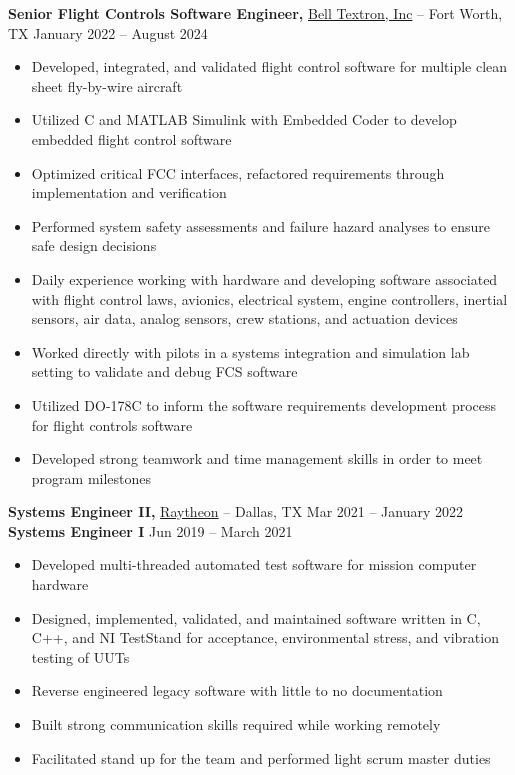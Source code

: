 \documentclass[11pt]{article}       %
\begin{document}
\textbf{Senior Flight Controls Software Engineer,} \href{https://www.bellflight.com/}{Bell Textron, Inc} -- Fort Worth, TX \hfill January 2022 -- August 2024 \\
\vspace{-9pt}
\begin{itemize}
  \item Developed, integrated, and validated flight control software for multiple clean sheet fly-by-wire aircraft
  \item Utilized C and MATLAB Simulink with Embedded Coder to develop embedded flight control software
  \item Optimized critical FCC interfaces, refactored requirements through implementation and verification
  \item Performed system safety assessments and failure hazard analyses to ensure safe design decisions
  \item Daily experience working with hardware and developing software associated with flight control laws, avionics, electrical system, engine controllers, inertial sensors, air data, analog sensors, crew stations, and actuation devices
  \item Worked directly with pilots in a systems integration and simulation lab setting to validate and debug FCS software
  \item Utilized DO-178C to inform the software requirements development process for flight controls software
  \item Developed strong teamwork and time management skills in order to meet program milestones
\end{itemize}

\textbf{Systems Engineer II,} \href{https://www.rtx.com/}{Raytheon} -- Dallas, TX \hfill Mar 2021 -- January 2022 \\
\textbf{Systems Engineer I} \hfill Jun 2019 -- March 2021 \\
\vspace{-9pt}
\begin{itemize}
  \item Developed multi-threaded automated test software for mission computer hardware
  \item Designed, implemented, validated, and maintained software written in C, C++, and NI TestStand for acceptance, environmental stress, and vibration testing of UUTs
  \item Reverse engineered legacy software with little to no documentation
  \item Built strong communication skills required while working remotely
  \item Facilitated stand up for the team and performed light scrum master duties
\end{itemize}
\end{document}
